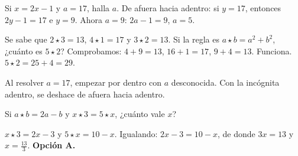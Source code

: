 \begin{ejemplo}
Si $\boxed{x} = 2x - 1$ y $\boxed{\boxed{a}} = 17$, halla $a$.
\solucion De afuera hacia adentro: si $\boxed{y} = 17$, entonces $2y - 1 = 17$ e $y = 9$. Ahora $\boxed{a} = 9$:
$2a - 1 = 9$, $a = 5$.
\end{ejemplo}

\begin{ejemplo}
Se sabe que $2 \star 3 = 13$, $4 \star 1 = 17$ y $3 \star 2 = 13$. Si la regla es $a \star b = a^2 + b^2$, ¿cuánto es
$5 \star 2$?
\solucion Comprobamos: $4 + 9 = 13$, $16 + 1 = 17$, $9 + 4 = 13$. Funciona. $5 \star 2 = 25 + 4 = 29$.
\end{ejemplo}

\begin{trampa}
Al resolver $\boxed{\boxed{a}} = 17$, empezar por dentro con $a$ desconocida. Con la incógnita adentro, se deshace
de afuera hacia adentro.
\end{trampa}

\begin{reto}
Si $a \star b = 2a - b$ y $x \star 3 = 5 \star x$, ¿cuánto vale $x$?
\end{reto}

\begin{retoresuelto}
$x \star 3 = 2x - 3$ y $5 \star x = 10 - x$. Igualando: $2x - 3 = 10 - x$, de donde $3x = 13$ y $x = \tfrac{13}{3}$.
\textbf{Opción A.}
\end{retoresuelto}

